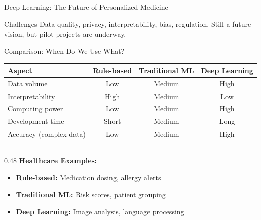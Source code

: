 \documentclass[aspectratio=169, 10pt]{beamer}
\begin{document}
\begin{frame}{Deep Learning: The Future of Personalized Medicine}
    \vspace{2mm}
    \begin{alertblock}{\footnotesize Challenges}
        \footnotesize
        Data quality, privacy, interpretability, bias, regulation. Still a future vision, but pilot projects are underway.
    \end{alertblock}

\end{frame}

\begin{frame}{Comparison: When Do We Use What?}

    \begin{table}
        \centering
        \footnotesize
        \begin{tabular}{lccc}
            \toprule
            \textbf{Aspect} & \textbf{Rule-based} & \textbf{Traditional ML} & \textbf{Deep Learning} \\
            \midrule
            Data volume & Low & Medium & High \\
            Interpretability & High & Medium & Low \\
            Computing power & Low & Medium & High \\
            Development time & Short & Medium & Long \\
            Accuracy (complex data) & Low & Medium & High \\
            \bottomrule
        \end{tabular}
    \end{table}

    \vspace{3mm}
    \begin{columns}
        \begin{column}{0.48\textwidth}
            \textbf{Healthcare Examples:}
            \begin{itemize}
                \item \textbf{Rule-based:} Medication dosing, allergy alerts
                \item \textbf{Traditional ML:} Risk scores, patient grouping
                \item \textbf{Deep Learning:} Image analysis, language processing
            \end{itemize}
        \end{column}


\end{columns}
\end{frame}
\end{document}
